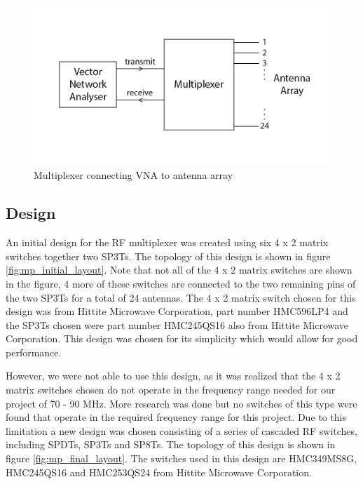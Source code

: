 \begin{figure}[h]
	\begin{center}
		\includegraphics[width=4.5in]{./images/multiplexer_connections.png}
		\caption{Multiplexer connecting VNA to antenna array}
		\label{fig:mp_connections}
	\end{center}
\end{figure}

\subsection{Design}

An initial design for the RF multiplexer was created using six 4 x 2 matrix switches together two SP3Ts. The topology of this design is shown in figure \ref{fig:mp_initial_layout}. Note that not all of the 4 x 2 matrix switches are shown in the figure, 4 more of these switches are connected to the two remaining pins of the two SP3Ts for a total of 24 antennas. The 4 x 2 matrix switch chosen for this design was from Hittite Microwave Corporation, part number HMC596LP4 and the SP3Ts chosen were part number HMC245QS16 also from Hittite Microwave Corporation.  This design was chosen for its simplicity which would allow for good performance.

However, we were not able to use this design, as it was realized that the 4 x 2 matrix switches chosen do not operate in the frequency range needed for our project of 70 - 90 MHz. More research was done but no switches of this type were found that operate in the required frequency range for this project. Due to this limitation a new design was chosen consisting of a series of cascaded RF switches, including SPDTs, SP3Ts and SP8Ts. The topology of this design is shown in figure \ref{fig:mp_final_layout}. The switches used in this design are HMC349MS8G, HMC245QS16 and HMC253QS24 from Hittite Microwave Corporation.


